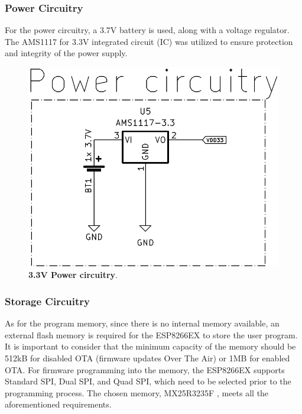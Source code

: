 \subsubsection{Power Circuitry}\label{02SubSub:PowerCircuitry}

For the power circuitry, a 3.7V battery is used, along with a voltage regulator.
The AMS1117 \cite{AMS1117} for 3.3V integrated circuit (IC) was utilized to ensure protection and integrity of 
the power supply.

\begin{figure}[H]
    \centering
    \includegraphics[scale = 0.5]{imagens/powerCircuitry.png}
    \caption{\textbf{3.3V Power circuitry}.}
    \label{02fig:powerCircuitry}
\end{figure}




\subsubsection{Storage Circuitry}\label{02SubSub:StorageCircuitry}

As for the program memory, since there is no internal memory available, an external flash memory is required for the ESP8266EX to store the user 
program. It is important to consider that the minimum capacity of the memory should be 512kB for disabled OTA (firmware updates Over The Air) or 1MB 
for enabled OTA. For firmware programming into the memory, the ESP8266EX supports Standard SPI, Dual SPI, and Quad SPI, which need to be selected prior 
to the programming process. The chosen memory, MX25R3235F \cite{ProgramMemoryMX}, meets all the aforementioned requirements. \\


